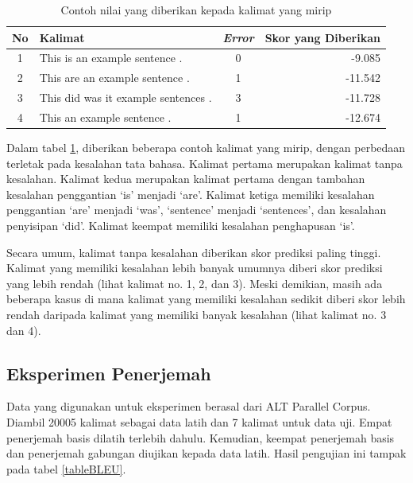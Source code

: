 \documentclass[conference]{IEEEtran}
\begin{document}
\begin{table}[h]
\caption{Contoh nilai yang diberikan kepada kalimat yang mirip}
\begin{center}
\begin{tabular}{|c|p{3.5cm}|c|r|}
\hline
\textbf{No}&\textbf{Kalimat}&\textbf{\textit{Error}}&\textbf{Skor yang Diberikan}\\
\hline
1&This is an example sentence .&0&-9.085\\
\hline
2&This are an example sentence . &1&-11.542\\
\hline
3&This did was it example sentences .&3&-11.728\\
\hline
4&This an example sentence .&1&-12.674\\
\hline

\end{tabular}
\label{tabeksperimenscoringsimilarexample}
\end{center}
\end{table}

Dalam tabel \ref{tabeksperimenscoringsimilarexample}, diberikan beberapa contoh kalimat yang mirip, dengan perbedaan terletak pada kesalahan tata bahasa. Kalimat pertama merupakan kalimat tanpa kesalahan. Kalimat kedua merupakan kalimat pertama dengan tambahan kesalahan penggantian ‘is’ menjadi ‘are’. Kalimat ketiga memiliki kesalahan penggantian ‘are’ menjadi ‘was’, ‘sentence’ menjadi ‘sentences’, dan kesalahan penyisipan ‘did’. Kalimat keempat memiliki kesalahan penghapusan ‘is’.

Secara umum, kalimat tanpa kesalahan diberikan skor prediksi paling tinggi. Kalimat yang memiliki kesalahan lebih banyak umumnya diberi skor prediksi yang lebih rendah (lihat kalimat no. 1, 2, dan 3). Meski demikian, masih ada beberapa kasus di mana kalimat yang memiliki kesalahan sedikit diberi skor lebih rendah daripada kalimat yang memiliki banyak kesalahan (lihat kalimat no. 3 dan 4).

\subsection{Eksperimen Penerjemah}

Data yang digunakan untuk eksperimen berasal dari ALT Parallel Corpus. Diambil 20005 kalimat sebagai data latih dan 7 kalimat untuk data uji. Empat penerjemah basis dilatih terlebih dahulu. Kemudian, keempat penerjemah basis dan penerjemah gabungan diujikan kepada data latih. Hasil pengujian ini tampak pada tabel \ref{tableBLEU}.
\end{document}
